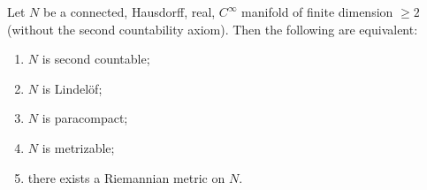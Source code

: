 Let $N$ be a connected, Hausdorff, real, $C^\infty$ manifold of finite dimension $\geq 2$ (without the second countability axiom). Then the following are equivalent:
\begin{enumerate}
    \item $N$ is second countable;
    \item $N$ is Lindel\"of;
    \item $N$ is paracompact;
    \item $N$ is metrizable;
    \item there exists a Riemannian metric on $N$.
\end{enumerate}
